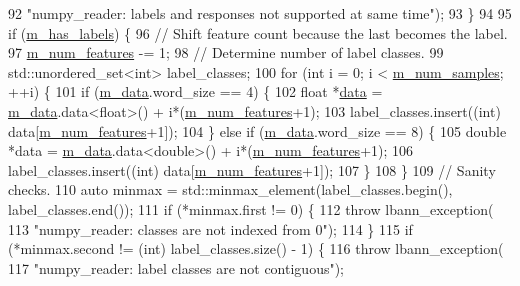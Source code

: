 \begin{DoxyCode}
92       \textcolor{stringliteral}{"numpy\_reader: labels and responses not supported at same time"});
93   \}
94 
95   \textcolor{keywordflow}{if} (\hyperlink{classlbann_1_1numpy__reader_a0e8caa5609e706bf909b78c4c35377b8}{m\_has\_labels}) \{
96     \textcolor{comment}{// Shift feature count because the last becomes the label.}
97     \hyperlink{classlbann_1_1numpy__reader_aef25f95077f565fa9616ec353b93f675}{m\_num\_features} -= 1;
98     \textcolor{comment}{// Determine number of label classes.}
99     std::unordered\_set<int> label\_classes;
100     \textcolor{keywordflow}{for} (\textcolor{keywordtype}{int} i = 0; i < \hyperlink{classlbann_1_1numpy__reader_a5e0d81c07c950a2d81645566a2ccd965}{m\_num\_samples}; ++i) \{
101       \textcolor{keywordflow}{if} (\hyperlink{classlbann_1_1numpy__reader_a6d43a1eae0fedb6fa237b24cef8f37fa}{m\_data}.word\_size == 4) \{
102         \textcolor{keywordtype}{float} *\hyperlink{namespacelbann_1_1cnpy__utils_a9ac86d96ccb1f8b4b2ea16441738781f}{data} = \hyperlink{classlbann_1_1numpy__reader_a6d43a1eae0fedb6fa237b24cef8f37fa}{m\_data}.data<\textcolor{keywordtype}{float}>() + i*(\hyperlink{classlbann_1_1numpy__reader_aef25f95077f565fa9616ec353b93f675}{m\_num\_features}+1);
103         label\_classes.insert((\textcolor{keywordtype}{int}) data[\hyperlink{classlbann_1_1numpy__reader_aef25f95077f565fa9616ec353b93f675}{m\_num\_features}+1]);
104       \} \textcolor{keywordflow}{else} \textcolor{keywordflow}{if} (\hyperlink{classlbann_1_1numpy__reader_a6d43a1eae0fedb6fa237b24cef8f37fa}{m\_data}.word\_size == 8) \{
105         \textcolor{keywordtype}{double} *data = \hyperlink{classlbann_1_1numpy__reader_a6d43a1eae0fedb6fa237b24cef8f37fa}{m\_data}.data<\textcolor{keywordtype}{double}>() + i*(\hyperlink{classlbann_1_1numpy__reader_aef25f95077f565fa9616ec353b93f675}{m\_num\_features}+1);
106         label\_classes.insert((\textcolor{keywordtype}{int}) data[\hyperlink{classlbann_1_1numpy__reader_aef25f95077f565fa9616ec353b93f675}{m\_num\_features}+1]);
107       \}
108     \}
109     \textcolor{comment}{// Sanity checks.}
110     \textcolor{keyword}{auto} minmax = std::minmax\_element(label\_classes.begin(), label\_classes.end());
111     \textcolor{keywordflow}{if} (*minmax.first != 0) \{
112       \textcolor{keywordflow}{throw} lbann\_exception(
113         \textcolor{stringliteral}{"numpy\_reader: classes are not indexed from 0"});
114     \}
115     \textcolor{keywordflow}{if} (*minmax.second != (\textcolor{keywordtype}{int}) label\_classes.size() - 1) \{
116       \textcolor{keywordflow}{throw} lbann\_exception(
117         \textcolor{stringliteral}{"numpy\_reader: label classes are not contiguous"});

\end{DoxyCode}
